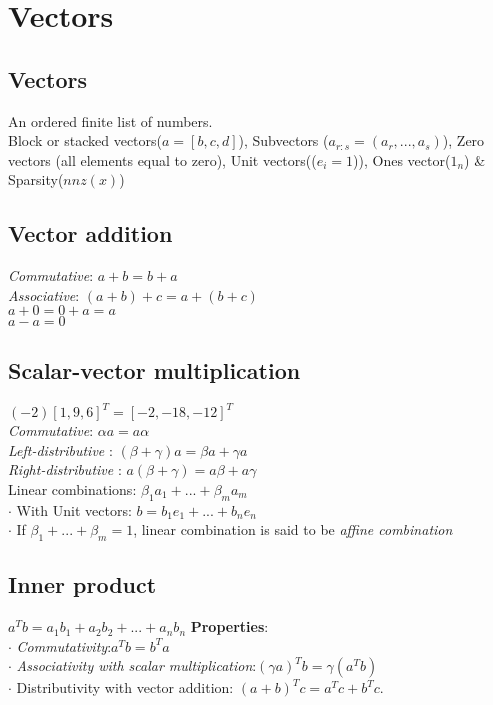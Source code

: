\section{Vectors}
\subsection*{Vectors}
An ordered finite list of numbers.\\
Block or stacked vectors($a = [b, c, d]$), Subvectors ($a_{r:s} = (a_r,...,a_s)$), Zero vectors (all elements equal to zero), Unit vectors(($e_i = 1$)), Ones vector($1_n$) \& Sparsity($nnz(x)$)

\subsection*{Vector addition}
\textit{Commutative}: $a + b = b + a$\\
\textit{Associative}: $(a + b) + c = a + (b + c)$\\
$a+0 = 0+a = a$\\
$a - a = 0$

\subsection{Scalar-vector multiplication}
$(-2)[1, 9, 6]^T = [-2, -18, -12]^T$\\
\textit{Commutative}: $\alpha a = a \alpha$\\
\textit{Left-distributive }: $(\beta + \gamma)a = \beta a + \gamma a$\\
\textit{Right-distributive }: $a(\beta + \gamma) = a\beta + a\gamma $ \\

Linear combinations: $\beta_1 a_1 + ... + \beta_m a_m$\\
$\cdot$ With Unit vectors: $b = b_1 e_1 +...+ b_n e_n$ \\
$\cdot$ If $\beta_1 +...+ \beta_m = 1$, linear combination is said to be \textit{affine combination}

\subsection{Inner product}
$a^T b = a_1 b_1 +a_2 b_2 +...+ a_n b_n$
\textbf{Properties}:\\
$\cdot$ \textit{Commutativity}:$a^T b = b^T a$\\
$\cdot$ \textit{Associativity with scalar multiplication}:$(\gamma a)^T b = \gamma(a^T b)$\\
$\cdot$ {Distributivity with vector addition}: $(a + b)^T c = a^T c + b^T c.$

